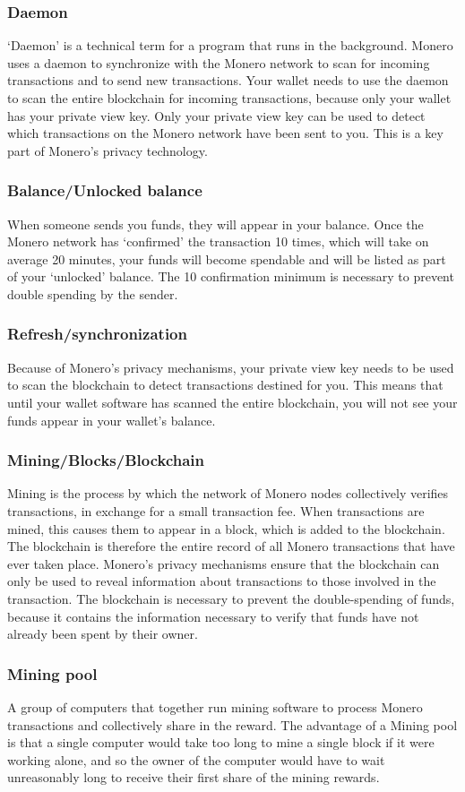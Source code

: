 \subsubsection{Daemon}
`Daemon' is a technical term for a program that runs in the background. Monero uses a daemon to synchronize with the Monero network to scan for incoming transactions and to send new transactions. Your wallet needs to use the daemon to scan the entire blockchain for incoming transactions, because only your wallet has your private view key. Only your private view key can be used to detect which transactions on the Monero network have been sent to you. This is a key part of Monero's privacy technology.
\subsubsection{Balance/Unlocked balance}
When someone sends you funds, they will appear in your balance. Once the Monero network has `confirmed' the transaction 10 times, which will take on average 20 minutes, your funds will become spendable and will be listed as part of your `unlocked' balance. The 10 confirmation minimum is necessary to prevent double spending by the sender.
\subsubsection{Refresh/synchronization}
	Because of Monero's privacy mechanisms, your private view key needs to be used to scan the blockchain to detect transactions destined for you. This means that until your wallet software has scanned the entire blockchain, you will not see your funds appear in your wallet's balance.
\subsubsection{Mining/Blocks/Blockchain}
Mining is the process by which the network of Monero nodes collectively verifies transactions, in exchange for a small transaction fee. When transactions are mined, this causes them to appear in a block, which is added to the blockchain. The blockchain is therefore the entire record of all Monero transactions that have ever taken place. Monero's privacy mechanisms ensure that the blockchain can only be used to reveal information about transactions to those involved in the transaction. The blockchain is necessary to prevent the double-spending of funds, because it contains the information necessary to verify that funds have not already been spent by their owner.
\subsubsection{Mining pool}
	A group of computers that together run mining software to process Monero transactions and collectively share in the reward. The advantage of a Mining pool is that a single computer would take too long to mine a single block if it were working alone, and so the owner of the computer would have to wait unreasonably long to receive their first share of the mining rewards.
